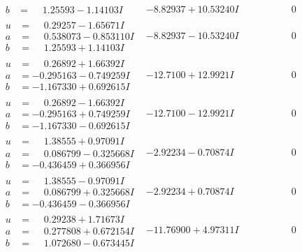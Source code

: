 \documentclass[1p]{elsarticle_modified}
\theoremstyle{definition}
\begin{document}
$$\begin{array}{c|c|c}
\begin{aligned}
b &= \phantom{-}1.25593 - 1.14103 I\end{aligned}
 & -8.82937 + 10.53240 I & \phantom{-0.000000 } 0 \\ \hline\begin{aligned}
u &= \phantom{-}0.29257 - 1.65671 I \\
a &= \phantom{-}0.538073 - 0.853110 I \\
b &= \phantom{-}1.25593 + 1.14103 I\end{aligned}
 & -8.82937 - 10.53240 I & \phantom{-0.000000 } 0 \\ \hline\begin{aligned}
u &= \phantom{-}0.26892 + 1.66392 I \\
a &= -0.295163 - 0.749259 I \\
b &= -1.167330 + 0.692615 I\end{aligned}
 & -12.7100 + 12.9921 I & \phantom{-0.000000 } 0 \\ \hline\begin{aligned}
u &= \phantom{-}0.26892 - 1.66392 I \\
a &= -0.295163 + 0.749259 I \\
b &= -1.167330 - 0.692615 I\end{aligned}
 & -12.7100 - 12.9921 I & \phantom{-0.000000 } 0 \\ \hline\begin{aligned}
u &= \phantom{-}1.38555 + 0.97091 I \\
a &= \phantom{-}0.086799 - 0.325668 I \\
b &= -0.436459 + 0.366956 I\end{aligned}
 & -2.92234 - 0.70874 I & \phantom{-0.000000 } 0 \\ \hline\begin{aligned}
u &= \phantom{-}1.38555 - 0.97091 I \\
a &= \phantom{-}0.086799 + 0.325668 I \\
b &= -0.436459 - 0.366956 I\end{aligned}
 & -2.92234 + 0.70874 I & \phantom{-0.000000 } 0 \\ \hline\begin{aligned}
u &= \phantom{-}0.29238 + 1.71673 I \\
a &= \phantom{-}0.277808 + 0.672154 I \\
b &= \phantom{-}1.072680 - 0.673445 I\end{aligned}
 & -11.76900 + 4.97311 I & \phantom{-0.000000 } 0 \\ \hline\begin{aligned}

\end{aligned}
\end{array}$$
\end{document}

